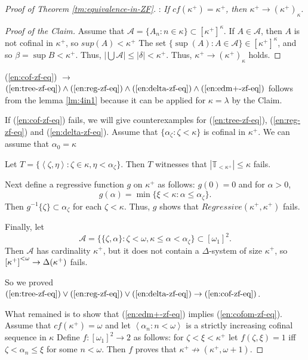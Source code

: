 \documentclass[a4paper,10pt,reqno]{amsart}
\numberwithin{equation}{section}
\theoremstyle{definition}
\theoremstyle{remark}
\newcommand{\mc}[1]{\mathcal{#1}}
\newcommand{\mbb}[1]{\mathbb{#1}}
\newcommand{\subs}{\subset}
\def\<{\left\langle}
\def\>{\right\rangle}
\begin{document}
    \begin{proof}[Proof of Theorem \ref{tm:equivalence-in-ZF}]
    

    \makebox[1pt]{}
\smallskip

        : {\em If $cf({\kappa}^+)={\kappa}^+$, then 
        ${\kappa}^+\to ({\kappa}^+)_{\kappa}$. 
    }
    \begin{proof}[Proof of the Claim]
    Assume that  
        $\mc A=\{A_n:n\in {\kappa}\}\subs [{{\kappa}^+}]^{{\kappa}}$. 
If $A\in \mc A$, then $A$ is not cofinal in ${\kappa}^+$, so $sup(A)<{\kappa}^+$   
        The set    $\{\sup(A):A\in \mc A\}\in {[{\kappa}^+]}^{{\kappa}}$, and so 
        ${\beta}=\sup B<{\kappa}^+$. Thus, $|\bigcup \mc A|\le |{\delta}|<{\kappa}^+$.
   Thus, ${\kappa}^+\to ({\kappa}^+)_{\kappa}$ holds. 
    \end{proof}

(\ref{en:cof-zf-eq}) $\to $ $(\ref{en:tree-zf-eq})\land (\ref{en:reg-zf-eq})\land (\ref{en:delta-zf-eq})
\land (\ref{en:edm+-zf-eq})$ follows  from the    lemma \ref{lm:4in1} because 
it can be applied for  
${\kappa}={\lambda}$
by the  Claim.

If (\ref{en:cof-zf-eq}) fails, we will give counterexamples
for (\ref{en:tree-zf-eq}),  (\ref{en:reg-zf-eq}) and (\ref{en:delta-zf-eq}).
Assume that $\{{\alpha}_{\zeta}:{\zeta}<{\kappa}\}$ is cofinal in ${\kappa}^+$.
We can assume that ${\alpha}_0={\kappa}$ 


Let 
$T=\{\<{\zeta},{\eta}\>:{\zeta}\in {\kappa}, {\eta}<{\alpha}_{\zeta}\}$.
Then $T$ witnesses that $|\mbb T_{<{\kappa}^+}|\le {\kappa}$ fails. 

Next 
define a regressive function $g$ on ${\kappa}^+$ as follows:
$g(0)=0$ and for ${\alpha}>0$,
\begin{displaymath}
g({\alpha})=\min\{{\xi}<{\kappa}:{\alpha}\le {\alpha}_{\zeta}\}.
\end{displaymath}
Then $g^{-1}\{{\zeta}\}\subs {\alpha}_{\zeta}$ for each ${\zeta}<{\kappa}$.
Thus,  $g$ shows that $Regressive({\kappa}^+, {\kappa}^+)$ fails. 

         
         
Finally,  let  
         $$\mc A=\big\{\{{\zeta},{\alpha}\}:{\zeta}<{\omega},{\kappa}\le {\alpha}<{\alpha}_{\zeta}\big\}\subs {[{\omega}_1]}^{2}.$$
         Then $\mc A$ has cardinality ${\kappa}^+$, but it does not contain a 
         $\Delta$-system of size ${\kappa}^+$, 
         so  ${[{\kappa}^+]}^{<{\omega}}\to \Delta({\kappa}^+)$ fails. 
    
So we proved 
$(\ref{en:tree-zf-eq})\lor  (\ref{en:reg-zf-eq}) \lor  (\ref{en:delta-zf-eq})\to 
(\ref{en:cof-zf-eq})$. 

What remained is to show that (\ref{en:edm+-zf-eq}) implies (\ref{en:cofom-zf-eq}). 
Assume that $cf({\kappa}^+)={\omega}$ and let $\<{\alpha}_n:n<{\omega}\>$
is a strictly increasing cofinal sequence in ${\kappa}$    
Define $f:{[{\omega}_1]}^{2}\to 2$ as follows: for ${\zeta}<{\xi}<{\kappa}^+$ let
$f({\zeta},{\xi})=1$ iff ${\zeta}<{\alpha}_n\le {\xi}$ for some $n<{\omega}$.
Then $f$ proves that ${\kappa}^+\not\to ({\kappa}^+,{\omega}+1)$. 
\end{proof}
\end{document}

